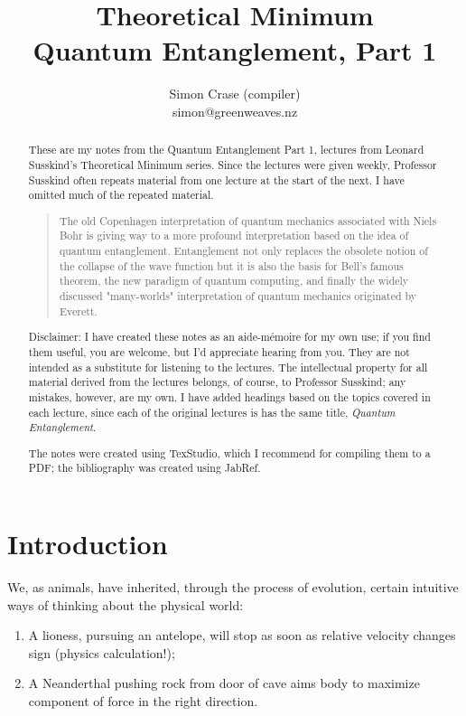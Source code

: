 \documentclass[]{article}
\title{Theoretical Minimum\\Quantum Entanglement, Part 1}
\author{Simon Crase (compiler)\\simon@greenweaves.nz}
\begin{document}
\maketitle

\begin{abstract}
These are my notes from the Quantum Entanglement Part 1, lectures\cite{susskind2013entanglement}  from Leonard Susskind's Theoretical Minimum series\cite{susskind2007theoretical}. Since the lectures were given weekly, Professor Susskind often repeats material from one lecture at the start of the next. I have omitted much of the repeated material.

	\begin{quotation}
		The old Copenhagen interpretation of quantum mechanics associated with Niels Bohr is giving way to a more profound interpretation based on the idea of quantum entanglement. Entanglement not only replaces the obsolete notion of the collapse of the wave function but it is also the basis for Bell's famous theorem, the new paradigm of quantum computing, and finally the widely discussed "many-worlds" interpretation of quantum mechanics originated by Everett.
	\end{quotation}

Disclaimer: I have created these notes as an aide-m\'emoire for my own use; if you find them useful, you are welcome, but I'd appreciate hearing from you. They are not intended 
as a substitute for listening to the lectures. The intellectual property for all material derived from the lectures belongs, of course, to Professor Susskind; any mistakes, however, are my own. I have added headings based on the topics covered in each lecture, since each of the original lectures is has the same title, \emph{Quantum Entanglement}.

The notes were created using TexStudio\cite{TexStudio}, which I recommend for compiling them to a PDF; the bibliography was created using JabRef\cite{Jabref}.

\end{abstract}

\tableofcontents
\listoffigures
\listoftables
\listoftheorems[title=List of Theorems and Definitions]

\section{Introduction}

We, as animals, have inherited, through the process of evolution, certain intuitive ways of thinking about the physical world:
\begin{enumerate}
	\item A lioness, pursuing an antelope, will stop as soon as relative velocity changes sign (physics calculation!);
	\item A Neanderthal pushing rock from door of cave aims body to maximize component of force in the right direction.
\end{enumerate}
\end{document}
